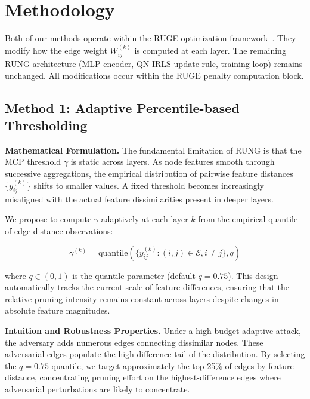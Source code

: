 \documentclass[sigconf]{acmart}
\begin{document}
\section{Methodology}\label{sec:methods}
Both of our methods operate within the RUGE optimization framework~\cite{hou2024rung}. They modify how the edge weight $W^{(k)}_{ij}$ is computed at each layer. The remaining RUNG architecture (MLP encoder, QN-IRLS update rule, training loop) remains unchanged. All modifications occur within the RUGE penalty computation block.

\subsection{Method 1: Adaptive Percentile-based Thresholding}\label{sec:method1}

\textbf{Mathematical Formulation.} The fundamental limitation of RUNG is that the MCP threshold $\gamma$ is static across layers. As node features smooth through successive aggregations, the empirical distribution of pairwise feature distances $\{y^{(k)}_{ij}\}$ shifts to smaller values. A fixed threshold becomes increasingly misaligned with the actual feature dissimilarities present in deeper layers.

We propose to compute $\gamma$ adaptively at each layer $k$ from the empirical quantile of edge-distance observations:

\begin{equation}
\gamma^{(k)} = \mathrm{quantile}\left(\{y^{(k)}_{ij} : (i,j) \in \mathcal{E}, i \ne j\}, q\right)
\label{eq:percentile_gamma}
\end{equation}

where $q \in (0, 1)$ is the quantile parameter (default $q = 0.75$). This design automatically tracks the current scale of feature differences, ensuring that the relative pruning intensity remains constant across layers despite changes in absolute feature magnitudes.

\textbf{Intuition and Robustness Properties.} Under a high-budget adaptive attack, the adversary adds numerous edges connecting dissimilar nodes. These adversarial edges populate the high-difference tail of the distribution. By selecting the $q = 0.75$ quantile, we target approximately the top 25\% of edges by feature distance, concentrating pruning effort on the highest-difference edges where adversarial perturbations are likely to concentrate.
\end{document}
